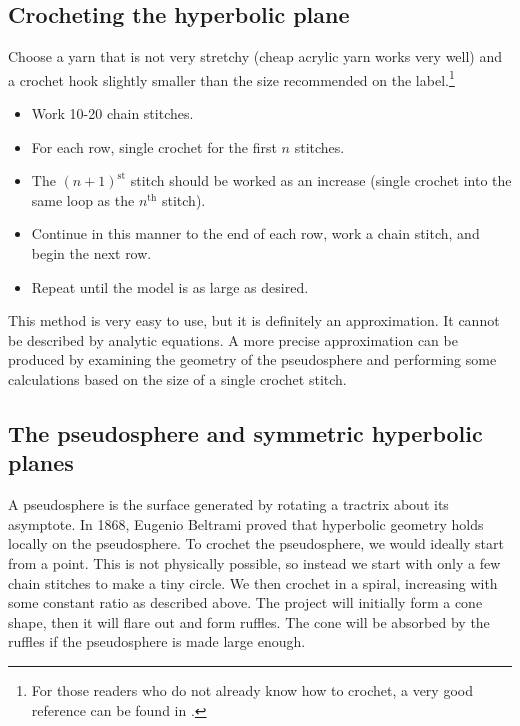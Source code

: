 \documentclass[letterpaper,titlepage]{article}
\begin{document}
\subsection{Crocheting the hyperbolic plane}
Choose a yarn that is not very stretchy (cheap acrylic yarn works very well) and a crochet hook slightly smaller than the size recommended on the label.\footnote{For those readers who do not already know how to crochet, a very good reference can be found in \cite{happyhooker}.}
\begin{itemize}
\item Work 10-20 chain stitches.
\item For each row, single crochet for the first $n$ stitches.
\item The $(n+1)^{\text{st}}$ stitch should be worked as an increase (single crochet into the same loop as the $n^{\text{th}}$ stitch).
\item Continue in this manner to the end of each row, work a chain stitch, and begin the next row.
\item Repeat until the model is as large as desired.
\end{itemize}
This method is very easy to use, but it is definitely an approximation.
It cannot be described by analytic equations.
A more precise approximation can be produced by examining the geometry of the pseudosphere and performing some calculations based on the size of a single crochet stitch.

\subsection{The pseudosphere and symmetric hyperbolic planes}
A pseudosphere is the surface generated by rotating a tractrix about its asymptote.
In 1868, Eugenio Beltrami proved that hyperbolic geometry holds locally on the pseudosphere.
To crochet the pseudosphere, we would ideally start from a point.
This is not physically possible, so instead we start with only a few chain stitches to make a tiny circle.
We then crochet in a spiral, increasing with some constant ratio as described above.
The project will initially form a cone shape, then it will flare out and form ruffles.
The cone will be absorbed by the ruffles if the pseudosphere is made large enough.
\end{document}
